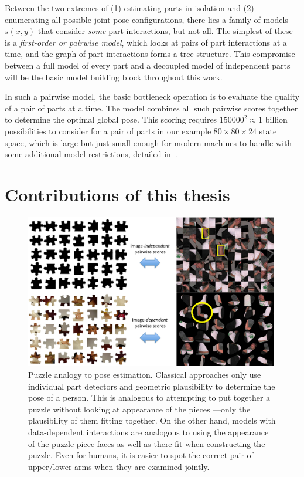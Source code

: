 Between the two extremes of (1) estimating parts in isolation and (2) 
enumerating all possible joint pose configurations, there lies a family of 
models $s(x,y)$ that consider {\em some} part interactions, but not all.  The 
simplest of these is a {\em first-order or pairwise model}, which looks at 
pairs of part interactions at a time, and the graph of part interactions forms 
a tree structure.  This compromise between a full model of every part and a 
decoupled model of independent parts will be the basic model building block 
throughout this work.

In such a pairwise model, the basic bottleneck operation is to evaluate the 
quality of a pair of parts at a time. The model combines all such pairwise 
scores together to determine the optimal global pose.  This scoring requires 
$150000^2 \approx 1$ billion possibilities to consider for a pair of parts in 
our example $80 \times 80 \times 24$ state space, which is large but just small 
enough for modern machines to handle with some additional model restrictions, 
detailed in~.


\section{Contributions of this thesis}
\begin{figure}[t!]
\begin{center}
\includegraphics[width=0.99\textwidth]{figs/puzzle.pdf}
\caption[Puzzle analogy to pose estimation.]{Puzzle analogy to pose estimation.  
Classical approaches only use individual part detectors and geometric 
plausibility to determine the pose of a person.  This is analogous to 
attempting to put together a puzzle without looking at appearance of the pieces 
---only the plausibility of them fitting together. On the other hand, models 
with data-dependent interactions are analogous to using the appearance of the 
puzzle piece faces as well as there fit when constructing the puzzle.  Even for 
humans, it is easier to spot the correct pair of upper/lower arms when they are 
examined jointly.}
\label{fig:puzzle}
\end{center}
\end{figure}

